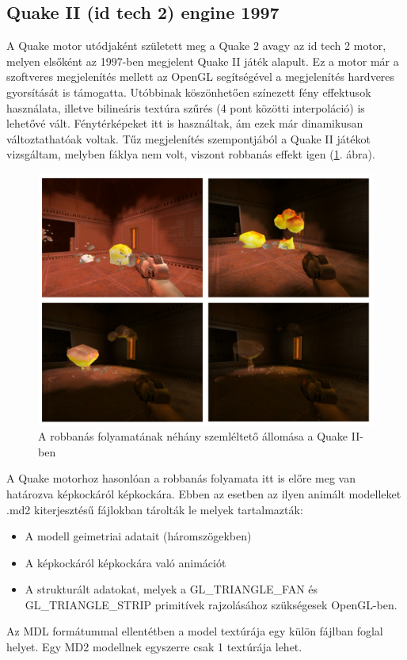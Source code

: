 \subsection{Quake II (id tech 2) engine 1997}
A Quake motor utódjaként született meg a Quake 2 avagy az id tech 2 motor, melyen elsőként az 1997-ben megjelent Quake II játék alapult. Ez a motor már a szoftveres megjelenítés mellett az OpenGL segítségével a megjelenítés hardveres gyorsítását is támogatta. Utóbbinak köszönhetően színezett fény effektusok használata, illetve bilineáris textúra szűrés (4 pont közötti interpoláció) is lehetővé vált. Fénytérképeket itt is használtak, ám ezek már dinamikusan változtathatóak voltak. \cite{wikiQuake2, fsQuake2} Tűz megjelenítés szempontjából a Quake II játékot vizsgáltam, melyben fáklya nem volt, viszont robbanás effekt igen (\ref{fig:quake2explosion}. ábra).

\begin{figure}[h]
 \includegraphics[width=\textwidth]{kepek/quake2explosion9.png}
 \caption{A robbanás folyamatának néhány szemléltető állomása a Quake II-ben}
 \label{fig:quake2explosion}
\end{figure}

A Quake motorhoz hasonlóan a robbanás folyamata itt is előre meg van határozva képkockáról képkockára. Ebben az esetben az ilyen animált modelleket .md2 kiterjesztésű fájlokban tárolták le melyek tartalmazták:
\begin{itemize} 
\item A modell geimetriai adatait (háromszögekben)
\item A képkockáról képkockára való animációt
\item A strukturált adatokat, melyek a GL\_TRIANGLE\_FAN és GL\_TRIANGLE\_STRIP primitívek rajzolásához szükségesek OpenGL-ben.
\end{itemize} 
Az MDL formátummal ellentétben a model textúrája egy külön fájlban foglal helyet. Egy MD2 modellnek egyszerre csak 1 textúrája lehet.  \cite{MD2format}

